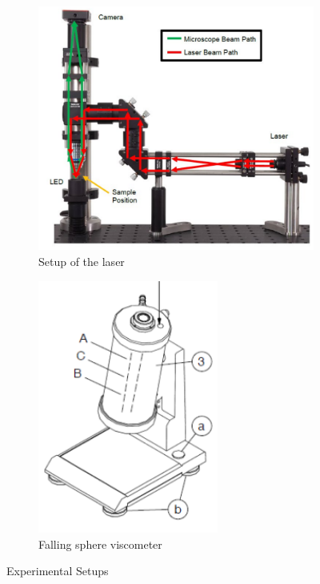 \documentclass{article}
\begin{document}
\begin{figure}[H]
     \centering
     \begin{subfigure}[b]{0.45\textwidth}
         \centering
         \includegraphics[width=\textwidth]{setup.png}
         \caption{Setup of the laser}
         \label{fig:setup}
     \end{subfigure}
     \hfill
     \begin{subfigure}[b]{0.45\textwidth}
         \centering
         \includegraphics[width=0.65\textwidth]{viskosimeter.png}
         \caption{Falling sphere viscometer}
         \label{fig:three sin x}
     \end{subfigure}
     \hfill
        \caption{Experimental Setups}
        \label{fig:three graphs}
\end{figure}
\end{document}
